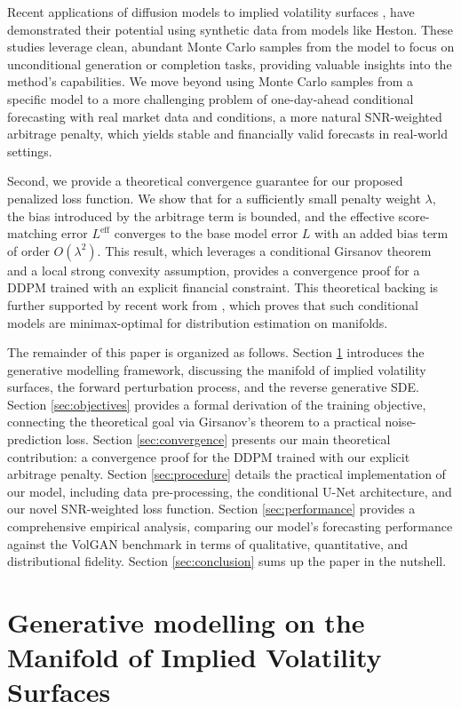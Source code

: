 \documentclass{article}
\begin{document}
Recent applications of diffusion models to implied volatility surfaces \citep{Hu_2024_tech}, have demonstrated their potential using synthetic data from models like Heston. These studies leverage clean, abundant Monte Carlo samples from the model to focus on unconditional generation or completion tasks, providing valuable insights into the method's capabilities. We move beyond using Monte Carlo samples from a specific model to a more challenging problem of one-day-ahead conditional forecasting with real market data and conditions, a more natural SNR-weighted arbitrage penalty, which yields stable and financially valid forecasts in real-world settings.

Second, we provide a theoretical convergence guarantee for our proposed penalized loss function. We show that for a sufficiently small penalty weight $\lambda$, the bias introduced by the arbitrage term is bounded, and the effective score-matching error $L^{\text{eff}}$ converges to the base model error $L$ with an added bias term of order $O(\lambda^2)$. This result, which leverages a conditional Girsanov theorem and a local strong convexity assumption, provides a convergence proof for a DDPM trained with an explicit financial constraint. This theoretical backing is further supported by recent work from \citet{Tang_Lin_Yang_2024}, which proves that such conditional models are minimax-optimal for distribution estimation on manifolds.

The remainder of this paper is organized as follows. Section \ref{sec:gen_modelling} introduces the generative modelling framework, discussing the manifold of implied volatility surfaces, the forward perturbation process, and the reverse generative SDE. Section \ref{sec:objectives} provides a formal derivation of the training objective, connecting the theoretical goal via Girsanov's theorem to a practical noise-prediction loss. Section \ref{sec:convergence} presents our main theoretical contribution: a convergence proof for the DDPM trained with our explicit arbitrage penalty. Section \ref{sec:procedure} details the practical implementation of our model, including data pre-processing, the conditional U-Net architecture, and our novel SNR-weighted loss function. Section \ref{sec:performance} provides a comprehensive empirical analysis, comparing our model's forecasting performance against the VolGAN benchmark in terms of qualitative, quantitative, and distributional fidelity. Section \ref{sec:conclusion} sums up the paper in the nutshell.

\section{Generative modelling on the Manifold of Implied Volatility Surfaces}
\label{sec:gen_modelling}
\end{document}
